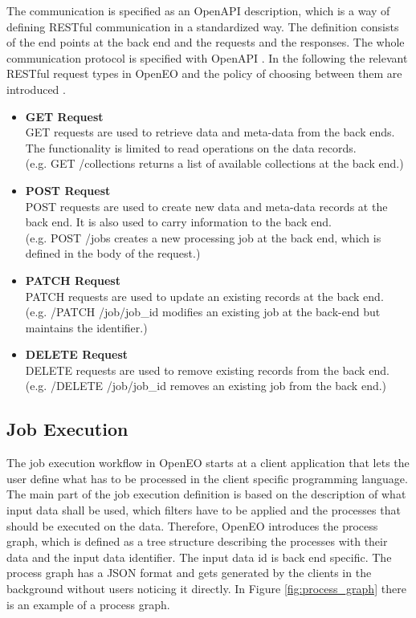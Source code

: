 \documentclass[draft,final]{vutinfth} %
\begin{document}
The communication is specified as an OpenAPI description, which is a way of defining RESTful communication in a standardized way. The definition consists of the end points at the back end and the requests and the responses. The whole communication protocol is specified with OpenAPI \cite{openapi}. 
In the following the relevant RESTful request types in OpenEO and the policy of choosing between them are introduced \cite{openeo_github}.

\begin{itemize}
	\item \textbf{GET Request} \\
	GET requests are used to retrieve data and meta-data from the back ends. The functionality is limited to read operations on the data records. \\(e.g. GET /collections returns a list of available collections at the back end.)
	\item \textbf{POST Request} \\ 
	POST requests are used to create new data and meta-data records at the back end. It is also used to carry information to the back end.  \\(e.g. POST /jobs creates a new processing job at the back end, which is defined in the body of the request.)  
	\item \textbf{PATCH Request} \\
	PATCH requests are used to update an existing records at the back end. \\(e.g. /PATCH /job/{job\_id} modifies an existing job at the back-end but maintains the identifier.)
	\item \textbf{DELETE Request} \\ 
	DELETE requests are used to remove existing records from the back end. \\(e.g. /DELETE /job/{job\_id} removes an existing job from the back end.)
\end{itemize}

\subsection{Job Execution}\label{Job Execution}
The job execution workflow in OpenEO starts at a client application that lets the user define what has to be processed in the client specific programming language.
The main part of the job execution definition is based on the description of what input data shall be used, which filters have to be applied and the processes that should be executed on the data. Therefore, OpenEO introduces the process graph, which is defined as a tree structure describing the processes with their data and the input data identifier. The input data id is back end specific. The process graph has a JSON format and gets generated by the clients in the background without users noticing it directly. In Figure \ref{fig:process_graph} there is an example of a process graph. 
\end{document}
